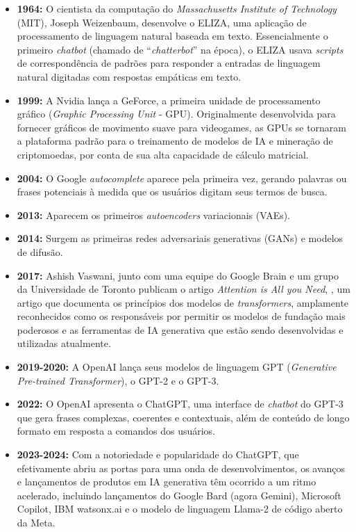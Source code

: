 \documentclass[a4paper, 12pt]{article}
\newcommand{\citeb}[1]{\bibleftbracket\cite{#1}\bibrightbracket}
\begin{document}
    \begin{itemize}
        \item \textbf{1964:} O cientista da computação do \textit{Massachusetts Institute of Technology} (MIT), Joseph Weizenbaum, desenvolve o ELIZA, uma aplicação de processamento de linguagem natural baseada em texto. Essencialmente o primeiro \textit{chatbot} (chamado de ``\textit{chatterbot}'' na época), o ELIZA usava \textit{scripts} de correspondência de padrões para responder a entradas de linguagem natural digitadas com respostas empáticas em texto.

        \item \textbf{1999:} A Nvidia lança a GeForce, a primeira unidade de processamento gráfico (\textit{Graphic Processing Unit} - GPU). Originalmente desenvolvida para fornecer gráficos de movimento suave para videogames, as GPUs se tornaram a plataforma padrão para o treinamento de modelos de IA e mineração de criptomoedas, por conta de sua alta capacidade de cálculo matricial.

        \item \textbf{2004:} O Google \textit{autocomplete} aparece pela primeira vez, gerando palavras ou frases potenciais à medida que os usuários digitam seus termos de busca.

        \item \textbf{2013:} Aparecem os primeiros \textit{autoencoders} variacionais (VAEs).

        \item \textbf{2014:} Surgem as primeiras redes adversariais generativas (GANs) e modelos de difusão.

        \item \textbf{2017:} Ashish Vaswani, junto com uma equipe do Google Brain e um grupo da Universidade de Toronto publicam o artigo \textit{Attention is All you Need}, \citeb{att_all_u_need}, um artigo que documenta os princípios dos modelos de \textit{transformers}, amplamente reconhecidos como os responsáveis por permitir os modelos de fundação mais poderosos e as ferramentas de IA generativa que estão sendo desenvolvidas e utilizadas atualmente.

        \item \textbf{2019-2020:} A OpenAI lança seus modelos de linguagem GPT (\textit{Generative Pre-trained Transformer}), o GPT-2 e o GPT-3.
    
        \item \textbf{2022:} O OpenAI apresenta o ChatGPT, uma interface de \textit{chatbot} do GPT-3 que gera frases complexas, coerentes e contextuais, além de conteúdo de longo formato em resposta a comandos dos usuários.
        
        \item \textbf{2023-2024:} Com a notoriedade e popularidade do ChatGPT, que efetivamente abriu as portas para uma onda de desenvolvimentos, os avanços e lançamentos de produtos em IA generativa têm ocorrido a um ritmo acelerado, incluindo lançamentos do Google Bard (agora Gemini), Microsoft Copilot, IBM watsonx.ai e o modelo de linguagem Llama-2 de código aberto da Meta.
    \end{itemize}
\end{document}
